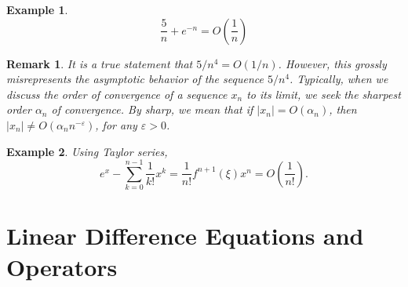 \documentclass[12pt,reqno]{amsart}
\numberwithin{equation}{section}  %
\newcommand{\ee}{\varepsilon}
\newtheorem*{remark}{Remark}
\newtheorem*{example}{Example}
\begin{document}
\begin{example}
\begin{equation*}
\frac{5}{n} + e^{-n} = O\left( \frac{1}{n}\right)
\end{equation*}
\end{example}

\begin{remark}
It is a true statement that $5/n^4 = O(1/n)$. However, this grossly
misrepresents the asymptotic behavior of the sequence $5/n^4$. Typically, when
we discuss the order of convergence of a sequence $x_n$ to its limit, we seek
the sharpest order $\alpha_n$ of convergence. By sharp, we mean that if $|x_n| =
O(\alpha_n)$, then $|x_n| \neq O(\alpha_n n^{-\ee})$, for any $\ee > 0$.
\end{remark}

\begin{example}
Using Taylor series,
\begin{equation*}
e^x - \sum_{k = 0}^{n-1} \frac{1}{k!}x^k = \frac{1}{n!} f^{n+1}(\xi)x^n =
O\left(\frac{1}{n!}\right).
\end{equation*}
\end{example}

\section{Linear Difference Equations and Operators}
\end{document}
